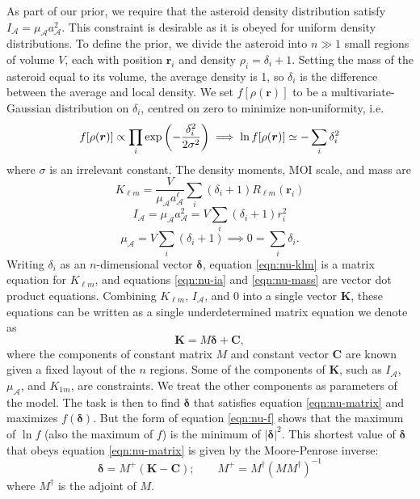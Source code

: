 As part of our prior, we require that the asteroid density distribution satisfy $I_\mathcal{A} = \mu_\mathcal{A} a_\mathcal{A}^2$. This constraint is desirable as it is obeyed for uniform density distributions. To define the prior, we divide the asteroid into $n \gg 1$ small regions of volume $V$, each with position $\bm r_i$ and density $\rho_i = \delta_i + 1$. Setting the mass of the asteroid equal to its volume, the average density is 1, so $\delta_i$ is the difference between the average and local density. We set $f[\rho(\bm r)]$ to be a multivariate-Gaussian distribution on $\delta_i$, centred on zero to minimize non-uniformity, i.e.
\begin{equation}
  f[\rho(\bm r)] \propto \prod_i \exp\left( -\frac{\delta_i^2}{2\sigma^2} \right) \implies \ln f[\rho(\bm r)] \simeq -\sum_i \delta_i^2
  \label{eqn:nu-f}
\end{equation}
where $\sigma$ is an irrelevant constant. The density moments, MOI scale, and mass are 
\begin{equation}
  K_{\ell m} = \frac{V}{\mu_\mathcal{A}a_\mathcal{A}^{\ell}} \sum_i (\delta_i + 1) R_{\ell m}(\bm r_i)
  \label{eqn:nu-klm}
\end{equation}
\begin{equation}
  I_\mathcal{A} = \mu_\mathcal{A} a_\mathcal{A}^2 = V \sum_i (\delta_i + 1) r_i^2
  \label{eqn:nu-ia}
\end{equation}
\begin{equation}
  \mu_\mathcal{A} = V\sum_i (\delta_i + 1) \implies 0 = \sum_i \delta_i.
  \label{eqn:nu-mass}
\end{equation}
Writing $\delta_i$ as an $n$-dimensional vector $\bm \delta$, equation \ref{eqn:nu-klm} is a matrix equation for $K_{\ell m}$, and equations \ref{eqn:nu-ia} and \ref{eqn:nu-mass} are vector dot product equations. Combining $K_{\ell m}$, $I_\mathcal{A}$, and $0$ into a single vector $\bm K$, these equations can be written as a single underdetermined matrix equation we denote as 
\begin{equation}
  \bm K = M \bm \delta + \bm C,
  \label{eqn:nu-matrix}
\end{equation}
where the components of constant matrix $M$ and constant vector $\bm C$ are known given a fixed layout of the $n$ regions. Some of the components of $\bm K$, such as $I_\mathcal{A}$, $\mu_\mathcal{A}$, and $K_{1m}$, are constraints. We treat the other components as parameters of the model. The task is then to find $\bm \delta$ that satisfies equation \ref{eqn:nu-matrix} and maximizes $f(\bm \delta)$. But the form of equation \ref{eqn:nu-f} shows that the maximum of $\ln f$ (also the maximum of $f$) is the minimum of $|\bm \delta|^2$. This shortest value of $\bm \delta$ that obeys equation \ref{eqn:nu-matrix} is given by the Moore-Penrose inverse:
\begin{equation}
  \bm \delta = M^+ (\bm K - \bm C); \qquad M^+ = M^\dagger(M M^\dagger)^{-1}
  \label{eqn:nu-delta}
\end{equation}
where $M^\dagger$ is the adjoint of $M$.

